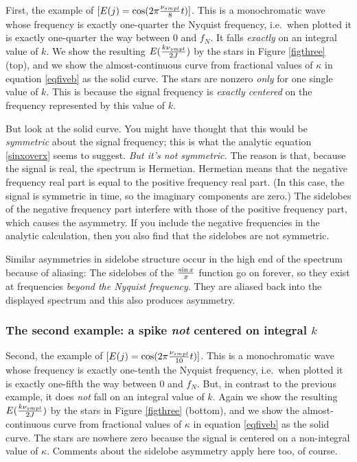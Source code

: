\documentclass[11pt,preprint]{aastex}
\begin{document}
	First, the example of $[E(j) = \cos(2 \pi {\nu_{smpl} \over 8}
t)]$. This is a monochromatic wave whose frequency is exactly
one-quarter the Nyquist frequency, i.e.\ when plotted it is exactly
one-quarter the way between 0 and $f_N$. It falls {\it exactly} on an
integral  value of $k$. We show the resulting $E({k \nu_{smpl} \over
2J})$ by the stars in Figure \ref{figthree} (top), and we show the
almost-continuous curve from fractional values of $\kappa$ in equation
\ref{eqfiveb} as the solid curve. The stars are nonzero {\it only} for
one single value of $k$. This is because the signal frequency is {\it
exactly centered} on the frequency represented by this value of $k$. 

	But look at the solid curve. You might have thought that this
would be {\it symmetric} about the signal frequency; this is what the
analytic equation \ref{sinxoverx} seems to suggest. {\it But it's not
symmetric.} The reason is that, because the signal is real, the spectrum
is Hermetian. Hermetian means that the negative frequency real part is
equal to the positive frequency real part. (In this case, the signal is
symmetric in time, so the imaginary components are zero.) The sidelobes
of the negative frequency part interfere with those of the positive
frequency part, which causes the asymmetry. If you include the negative
frequencies in the analytic calculation, then you also find that the
sidelobes are not symmetric. 

	Similar asymmetries in sidelobe structure occur in the high end
of the spectrum because of aliasing: The sidelobes of the $\sin x \over
x$ function go on forever, so they exist at frequencies {\it beyond the
Nyquist frequency}. They are aliased back into the displayed spectrum
and this also produces asymmetry.

\subsubsection{The second example: a spike {\it not} centered on
integral $k$}

	Second, the example of $[E(j) = \cos(2 \pi {\nu_{smpl} \over 10}
t)]$. This is a monochromatic wave whose frequency is exactly one-tenth
the Nyquist frequency, i.e.\ when plotted it is exactly one-fifth the
way between 0 and $f_N$. But, in contrast to the previous example, it
does {\it not} fall on an integral value of $k$. Again we show the
resulting $E({k \nu_{smpl} \over 2J})$ by the stars in Figure
\ref{figthree} (bottom), and we show the almost-continuous curve from
fractional values of $\kappa$ in equation \ref{eqfiveb} as the solid
curve. The stars are nowhere zero because the signal is centered on a
non-integral value of $\kappa$. Comments about the sidelobe asymmetry
apply here too, of course. 
\end{document}

